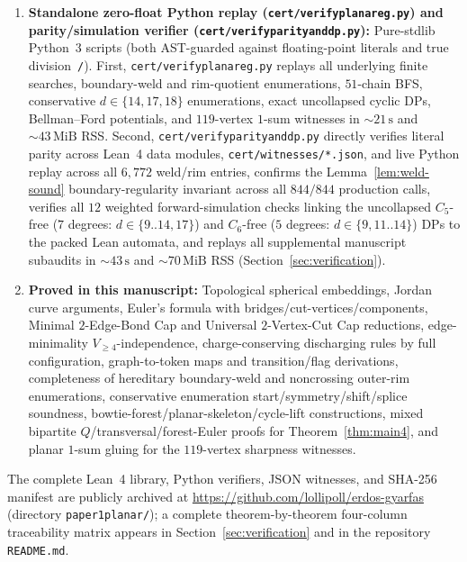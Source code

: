 \documentclass[11pt,reqno]{amsart}
\theoremstyle{plain}
\theoremstyle{definition}
\theoremstyle{remark}
\newcommand{\Vge}{V_{\ge 4}}
\DeclareRobustCommand{\_}{\ifmmode\text{\textunderscore}\else\textunderscore\allowbreak\fi}
\begin{document}
\begin{enumerate}[label=(\roman*),leftmargin=2.2em]
  \item \textbf{Standalone zero-float Python replay (\texttt{cert/verify\_planar\_eg.py}) and parity/simulation verifier (\texttt{cert/verify\_parity\_and\_dp.py}):} Pure-stdlib Python~3 scripts (both AST-guarded against floating-point literals and true division~\texttt{/}). First, \texttt{cert/verify\_planar\_eg.py} replays all underlying finite searches, boundary-weld and rim-quotient enumerations, $51$-chain BFS, conservative $d \in \{14,17,18\}$ enumerations, exact uncollapsed cyclic DPs, Bellman--Ford potentials, and $119$-vertex $1$-sum witnesses in ${\sim}21\,\mathrm{s}$ and ${\sim}43\,\mathrm{MiB}$ RSS. Second, \texttt{cert/verify\_parity\_and\_dp.py} directly verifies literal parity across Lean~4 data modules, \texttt{cert/witnesses/*.json}, and live Python replay across all $6{,}772$ weld/rim entries, confirms the Lemma~\ref{lem:weld-sound} boundary-regularity invariant across all $844/844$ production calls, verifies all $12$ weighted forward-simulation checks linking the uncollapsed $C_5$-free ($7$ degrees: $d \in \{9..14, 17\}$) and $C_6$-free ($5$ degrees: $d \in \{9, 11..14\}$) DPs to the packed Lean automata, and replays all supplemental manuscript subaudits in ${\sim}43\,\mathrm{s}$ and ${\sim}70\,\mathrm{MiB}$ RSS (Section~\ref{sec:verification}).
  \item \textbf{Proved in this manuscript:} Topological spherical embeddings, Jordan curve arguments, Euler's formula with bridges/cut-vertices/components, Minimal $2$-Edge-Bond Cap and Universal $2$-Vertex-Cut Cap reductions, edge-minimality $\Vge$-independence, charge-conserving discharging rules by full configuration, graph-to-token maps and transition/flag derivations, completeness of hereditary boundary-weld and noncrossing outer-rim enumerations, conservative enumeration start/symmetry/shift/splice soundness, bowtie-forest/planar-skeleton/cycle-lift constructions, mixed bipartite $Q$/transversal/forest-Euler proofs for Theorem~\ref{thm:main4}, and planar $1$-sum gluing for the $119$-vertex sharpness witnesses.
\end{enumerate}
The complete Lean~4 library, Python verifiers, JSON witnesses, and SHA-256 manifest are publicly archived at \url{https://github.com/lollipoll/erdos-gyarfas} (directory \texttt{paper1\_planar/}); a complete theorem-by-theorem four-column traceability matrix appears in Section~\ref{sec:verification} and in the repository \texttt{README.md}.

\end{document}
